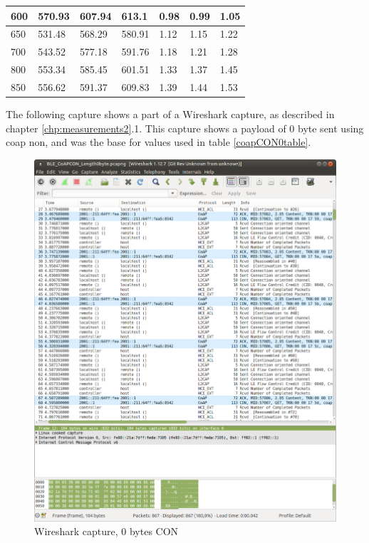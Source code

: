 \begin{table}[H]
\begin{tabular}{|l|l|l|l|l|l|l|}
600              & 570.93               & 607.94               & 613.1                & 0.98              & 0.99              & 1.05              \\ \hline
650              & 531.48               & 568.29               & 580.91               & 1.12              & 1.15              & 1.22              \\ \hline
700              & 543.52               & 577.18               & 591.76               & 1.18              & 1.21              & 1.28              \\ \hline
800              & 553.34               & 585.45               & 601.51               & 1.33              & 1.37              & 1.45              \\ \hline
850              & 556.62               & 591.37               & 609.83               & 1.39              & 1.44              & 1.53              \\ \hline
\end{tabular}
\end{table}



The following capture shows a part of a Wireshark capture, as described in chapter \ref{chp:measurements2}.1. This capture shows a \gls{payload} of 0 byte sent using \gls{coap} \gls{non}, and was the base for values used in table \ref{coapCON0table}. 

\begin{figure}[ht]
    \centering
    \includegraphics[width=1.1\textwidth]{0byteCONwireshark.png}    
    \caption{Wireshark capture, 0 bytes CON}
    \label{fig:wireshark0byteCONappendixB}
\end{figure}

